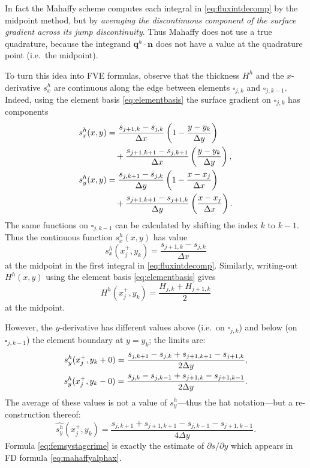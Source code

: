 \documentclass[twocolumn,letterpaper]{igs}
\newcommand\bn{\mathbf{n}}
\newcommand\bq{\mathbf{q}}
\begin{document}
In fact the Mahaffy scheme computes each integral in \eqref{eq:fluxintdecomp} by the midpoint method, but by \emph{averaging the discontinuous component of the surface gradient across its jump discontinuity}.  Thus Mahaffy does not use a true quadrature, because the integrand $\bq^h\cdot \bn$ does not have a value at the quadrature point (i.e.~the midpoint).

To turn this idea into FVE formulas, observe that the thickness $H^h$ and the $x$-derivative $s^h_x$ are continuous along the edge between elements $\square_{j,k}$ and $\square_{j,k-1}$.  Indeed, using the element basis \eqref{eq:elementbasis} the surface gradient on $\square_{j,k}$ has components
\begin{align}
s^h_x(x,y) &= \frac{s_{j+1,k}-s_{j,k}}{\Delta x} \left(1-\frac{y-y_k}{\Delta y}\right)  \label{eq:grads} \\
   &\quad + \frac{s_{j+1,k+1}-s_{j,k+1}}{\Delta x} \left(\frac{y-y_k}{\Delta y}\right), \notag \\
s^h_y(x,y) &= \frac{s_{j,k+1}-s_{j,k}}{\Delta y} \left(1-\frac{x-x_j}{\Delta x}\right) \notag \\
   &\quad + \frac{s_{j+1,k+1}-s_{j+1,k}}{\Delta y} \left(\frac{x-x_j}{\Delta x}\right). \notag
\end{align}
The same functions on $\square_{j,k-1}$ can be calculated by shifting the index $k$ to $k-1$.  Thus the continuous function $s^h_x(x,y)$ has value
\begin{equation}
s^h_x(x_j^+,y_k) = \frac{s_{j+1,k}-s_{j,k}}{\Delta x} \label{eq:femsxstag}
\end{equation}
at the midpoint in the first integral in \eqref{eq:fluxintdecomp}.  Similarly, writing-out $H^h(x,y)$ using the element basis \eqref{eq:elementbasis} gives
\begin{equation}
H^h(x_j^+,y_k) = \frac{H_{j,k}+H_{j+1,k}}{2} \label{eq:femHstag}
\end{equation}
at the midpoint.

However, the $y$-derivative has different values above (i.e.~on $\square_{j,k}$) and below (on $\square_{j,k-1}$) the element boundary at $y = y_k$; the limits are:
\begin{align}
s^h_y(x_j^+,y_k+0) = \frac{s_{j,k+1}-s_{j,k} + s_{j+1,k+1}-s_{j+1,k}}{2\Delta y}, \\
s^h_y(x_j^+,y_k-0) = \frac{s_{j,k}-s_{j,k-1} + s_{j+1,k}-s_{j+1,k-1}}{2\Delta y}. \notag
\end{align}
The average of these values is not a value of $s_y^h$---thus the hat notation---but a re-construction thereof:
\begin{equation}
\widehat{s^h_y}(x_j^+,y_k) = \frac{s_{j,k+1} + s_{j+1,k+1} - s_{j,k-1} - s_{j+1,k-1}}{4\Delta y}. \label{eq:femsystagcrime}
\end{equation}
Formula \eqref{eq:femsystagcrime} is exactly the estimate of $\partial s/\partial y$ which appears in FD formula \eqref{eq:mahaffyalphax}.
\end{document}
